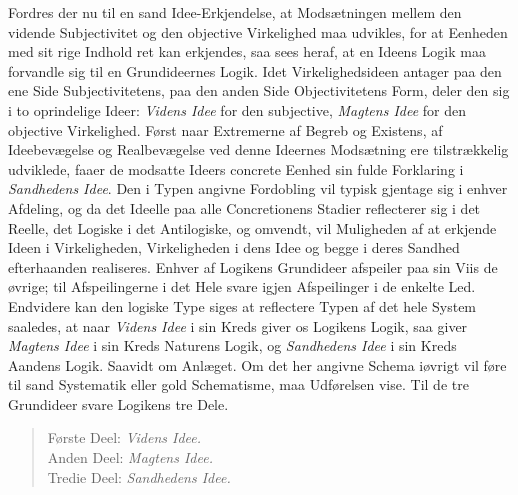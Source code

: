 \documentclass[12pt]{book}
\begin{document}
Fordres der nu til en sand Idee-Erkjendelse, at Modsætningen mellem den vidende
Subjectivitet og den objective Virkelighed maa udvikles, for at Eenheden med sit
rige Indhold ret
kan erkjendes, saa sees heraf, at en Ideens Logik maa forvandle sig til en
Grundideernes Logik. Idet Virkelighedsideen antager paa den ene Side
Subjectivitetens, paa den anden Side Objectivitetens Form, deler den sig i to
oprindelige Ideer: \emph{Videns Idee} for den subjective, \emph{Magtens Idee} for
den objective Virkelighed. Først naar Extremerne af Begreb og Existens, af
Ideebevægelse og Realbevægelse ved denne Ideernes Modsætning ere tilstrækkelig
udviklede, faaer de modsatte Ideers concrete Eenhed sin fulde Forklaring i
\emph{Sandhedens Idee}. Den i Typen angivne Fordobling vil typisk gjentage sig i
enhver Afdeling, og da det Ideelle paa alle Concretionens Stadier reflecterer sig i
det Reelle, det Logiske i det Antilogiske, og omvendt, vil Muligheden af at
erkjende Ideen i Virkeligheden, Virkeligheden i dens Idee og begge i deres Sandhed
efterhaanden realiseres. Enhver af Logikens Grundideer afspeiler paa sin Viis de
øvrige; til Afspeilingerne i det Hele svare igjen Afspeilinger i de enkelte Led.
Endvidere kan den logiske Type siges at reflectere Typen af det hele System
saaledes, at naar \emph{Videns Idee} i sin Kreds giver os Logikens Logik, saa giver
\emph{Magtens Idee} i sin Kreds Naturens Logik, og \emph{Sandhedens Idee} i sin
Kreds Aandens Logik. Saavidt om Anlæget. Om det her angivne Schema iøvrigt vil føre
til sand Systematik eller gold Schematisme, maa Udførelsen vise. Til de tre
Grundideer svare Logikens tre Dele.
\begin{quote}
Første Deel: \emph{Videns Idee.}\\
Anden Deel: \emph{Magtens Idee.}\\
Tredie Deel: \emph{Sandhedens Idee.}
\end{quote}

\end{document}
